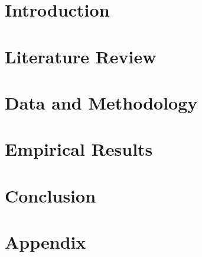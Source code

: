 \documentclass[12pt, oneside, letterpaper]{report}
\begin{document}



\section{Introduction}
\label{sec:p2_introduction}


\section{Literature Review}
\label{sec:p2_literature}


\section{Data and Methodology}
\label{sec:p2_data}


\section{Empirical Results}
\label{sec:p2_results}


\section{Conclusion}
\label{sec:p2_conclusion}


\clearpage
\begin{singlespace}

\end{singlespace}

\clearpage
\appendix
\section{Appendix}







\end{document}
